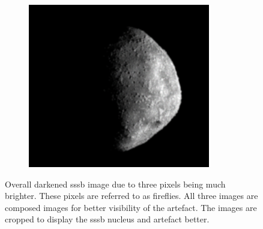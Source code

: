 \begin{figure}[htb]
\begin{subfigure}[b]{0.32\textwidth}
            \label{fig:render_dark_2}
        \end{subfigure}
        \begin{subfigure}[b]{0.32\textwidth}
            \centering
            \includegraphics[width=\textwidth]{doc/thesis/0_figures/composition_darkening/Inst_2017-08-15T115819-007000_center.png}
            \label{fig:render_dark_3}
        \end{subfigure}
    \caption{Overall darkened \gls{sssb} image due to three pixels being much brighter. These pixels are referred to as fireflies. All three images are composed images for better visibility of the artefact. The images are cropped to display the \gls{sssb} nucleus and artefact better.}
    \label{fig:render_dark}
\end{figure}

\clearpage

